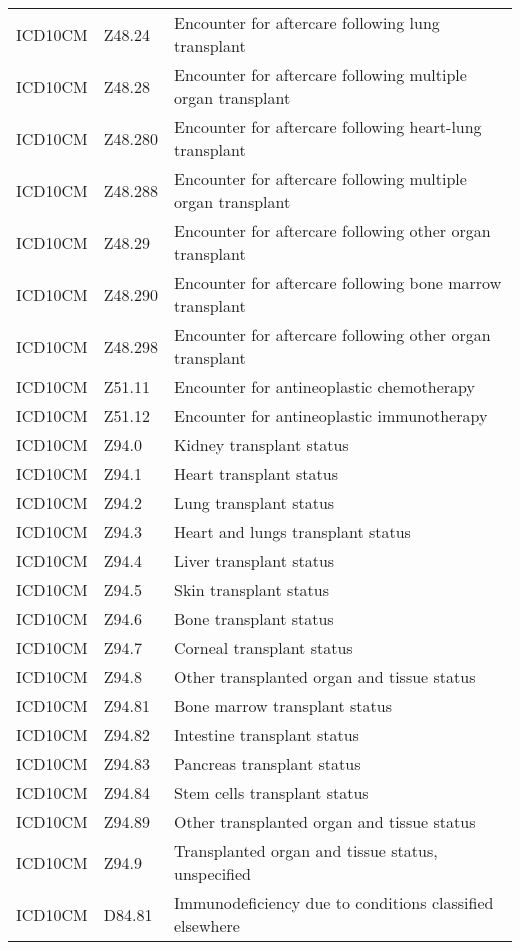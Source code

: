 \begin{table}[ht]
\begin{tabular}{lll}
  ICD10CM & Z48.24 & Encounter for aftercare following lung transplant \\ 
  ICD10CM & Z48.28 & Encounter for aftercare following multiple organ transplant \\ 
  ICD10CM & Z48.280 & Encounter for aftercare following heart-lung transplant \\ 
  ICD10CM & Z48.288 & Encounter for aftercare following multiple organ transplant \\ 
  ICD10CM & Z48.29 & Encounter for aftercare following other organ transplant \\ 
  ICD10CM & Z48.290 & Encounter for aftercare following bone marrow transplant \\ 
  ICD10CM & Z48.298 & Encounter for aftercare following other organ transplant \\ 
  ICD10CM & Z51.11 & Encounter for antineoplastic chemotherapy \\ 
  ICD10CM & Z51.12 & Encounter for antineoplastic immunotherapy \\ 
  ICD10CM & Z94.0 & Kidney transplant status \\ 
  ICD10CM & Z94.1 & Heart transplant status \\ 
  ICD10CM & Z94.2 & Lung transplant status \\ 
  ICD10CM & Z94.3 & Heart and lungs transplant status \\ 
  ICD10CM & Z94.4 & Liver transplant status \\ 
  ICD10CM & Z94.5 & Skin transplant status \\ 
  ICD10CM & Z94.6 & Bone transplant status \\ 
  ICD10CM & Z94.7 & Corneal transplant status \\ 
  ICD10CM & Z94.8 & Other transplanted organ and tissue status \\ 
  ICD10CM & Z94.81 & Bone marrow transplant status \\ 
  ICD10CM & Z94.82 & Intestine transplant status \\ 
  ICD10CM & Z94.83 & Pancreas transplant status \\ 
  ICD10CM & Z94.84 & Stem cells transplant status \\ 
  ICD10CM & Z94.89 & Other transplanted organ and tissue status \\ 
  ICD10CM & Z94.9 & Transplanted organ and tissue status, unspecified \\ 
  ICD10CM & D84.81 & Immunodeficiency due to conditions classified elsewhere \\ 

\end{tabular}
\end{table}
